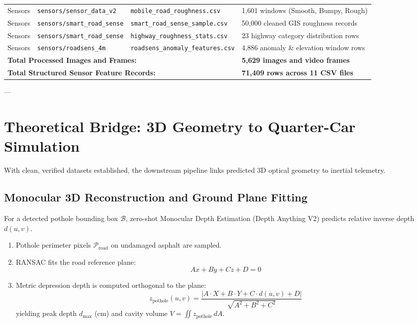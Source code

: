 \documentclass[11pt,a4paper]{article}
\begin{document}
\begin{table}[htbp]
\begin{tabularx}{\textwidth}{llp{3.2cm}p{5.2cm}}
Sensors & \texttt{sensors/sensor\_data\_v2} & \texttt{mobile\_road\_roughness.csv} & 1,601 windows (Smooth, Bumpy, Rough) \\
Sensors & \texttt{sensors/smart\_road\_sense} & \texttt{smart\_road\_sense\_sample.csv} & 50,000 cleaned GIS roughness records \\
Sensors & \texttt{sensors/smart\_road\_sense} & \texttt{highway\_roughness\_stats.csv} & 23 highway category distribution rows \\
Sensors & \texttt{sensors/roadsens\_4m} & \texttt{roadsens\_anomaly\_features.csv} & 4,886 anomaly \& elevation window rows \\
\midrule
\multicolumn{3}{l}{\textbf{Total Processed Images and Frames:}} & \textbf{5,629 images and video frames} \\
\multicolumn{3}{l}{\textbf{Total Structured Sensor Feature Records:}} & \textbf{71,409 rows across 11 CSV files} \\
\bottomrule
\end{tabularx}
\end{table}

---

\section{Theoretical Bridge: 3D Geometry to Quarter-Car Simulation}

With clean, verified datasets established, the downstream pipeline links predicted 3D optical geometry to inertial telemetry.

\subsection{Monocular 3D Reconstruction and Ground Plane Fitting}
For a detected pothole bounding box $\mathcal{B}$, zero-shot Monocular Depth Estimation (Depth Anything V2) predicts relative inverse depth $d(u, v)$. 
\begin{enumerate}
    \item Pothole perimeter pixels $\mathcal{P}_{\text{road}}$ on undamaged asphalt are sampled.
    \item RANSAC fits the road reference plane:
    \begin{equation}
    Ax + By + Cz + D = 0
    \end{equation}
    \item Metric depression depth is computed orthogonal to the plane:
    \begin{equation}
    z_{\text{pothole}}(u, v) = \frac{|A \cdot X + B \cdot Y + C \cdot d(u,v) + D|}{\sqrt{A^2 + B^2 + C^2}}
    \end{equation}
    yielding peak depth $d_{\max}$ (cm) and cavity volume $V = \iint z_{\text{pothole}} \, dA$.
\end{enumerate}
\end{document}
